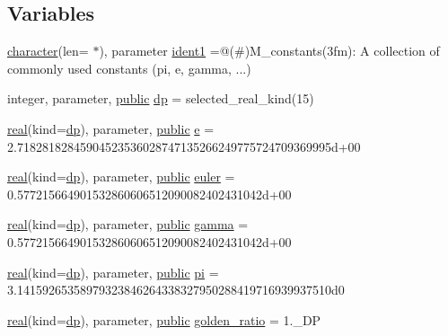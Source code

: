 \subsection*{Variables}
\begin{DoxyCompactItemize}
\item 
\hyperlink{option__stopwatch_83_8txt_abd4b21fbbd175834027b5224bfe97e66}{character}(len= $\ast$), parameter \hyperlink{namespacem__constants_a04d48a101c8ff0dc51bfe39e078339c2}{ident1} =\textquotesingle{}@(\#)M\+\_\+constants(3fm)\+: A collection of commonly used constants (pi, e, gamma, ...)\textquotesingle{}
\item 
integer, parameter, \hyperlink{M__stopwatch_83_8txt_a2f74811300c361e53b430611a7d1769f}{public} \hyperlink{namespacem__constants_a15743b6f1a6f57ab5b842d79fbffdd98}{dp} = selected\+\_\+real\+\_\+kind(15)
\item 
\hyperlink{read__watch_83_8txt_abdb62bde002f38ef75f810d3a905a823}{real}(kind=\hyperlink{namespacem__constants_a15743b6f1a6f57ab5b842d79fbffdd98}{dp}), parameter, \hyperlink{M__stopwatch_83_8txt_a2f74811300c361e53b430611a7d1769f}{public} \hyperlink{namespacem__constants_a79882cb1d94180e4edaed2f1c683f21b}{e} = 2.\+71828182845904523536028747135266249775724709369995d+00
\item 
\hyperlink{read__watch_83_8txt_abdb62bde002f38ef75f810d3a905a823}{real}(kind=\hyperlink{namespacem__constants_a15743b6f1a6f57ab5b842d79fbffdd98}{dp}), parameter, \hyperlink{M__stopwatch_83_8txt_a2f74811300c361e53b430611a7d1769f}{public} \hyperlink{namespacem__constants_a2dc8df75875a345dc61324f97e7dc780}{euler} = 0.\+577215664901532860606512090082402431042d+00
\item 
\hyperlink{read__watch_83_8txt_abdb62bde002f38ef75f810d3a905a823}{real}(kind=\hyperlink{namespacem__constants_a15743b6f1a6f57ab5b842d79fbffdd98}{dp}), parameter, \hyperlink{M__stopwatch_83_8txt_a2f74811300c361e53b430611a7d1769f}{public} \hyperlink{namespacem__constants_a201cd76884fb830c6f8495f821f2a895}{gamma} = 0.\+577215664901532860606512090082402431042d+00
\item 
\hyperlink{read__watch_83_8txt_abdb62bde002f38ef75f810d3a905a823}{real}(kind=\hyperlink{namespacem__constants_a15743b6f1a6f57ab5b842d79fbffdd98}{dp}), parameter, \hyperlink{M__stopwatch_83_8txt_a2f74811300c361e53b430611a7d1769f}{public} \hyperlink{namespacem__constants_a3ce903650fe1630c8957cdf487778e7f}{pi} = 3.\+14159265358979323846264338327950288419716939937510d0
\item 
\hyperlink{read__watch_83_8txt_abdb62bde002f38ef75f810d3a905a823}{real}(kind=\hyperlink{namespacem__constants_a15743b6f1a6f57ab5b842d79fbffdd98}{dp}), parameter, \hyperlink{M__stopwatch_83_8txt_a2f74811300c361e53b430611a7d1769f}{public} \hyperlink{namespacem__constants_a31fdb956c0048479c8d3d37f2b3e3edf}{golden\+\_\+ratio} = 1.\+\_\+\+DP

\end{DoxyCompactItemize}
